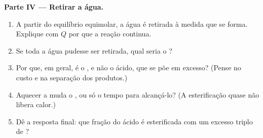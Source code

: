 \begin{problem}
\medskip
\noindent\textbf{Parte IV --- Retirar a água.}
\begin{enumerate}[resume]
  \item A partir do equilíbrio equimolar, a água é retirada à medida que
        se forma. Explique com $Q$ por que a reação continua.
  \item Se toda a água pudesse ser retirada, qual seria o ?
  \item Por que, em geral, é o , e não o ácido, que se põe em
        excesso? (Pense no custo e na separação dos produtos.)
  \item Aquecer a  muda o , ou só o tempo para
        alcançá-lo? (A esterificação quase não libera calor.)
  \item Dê a resposta final: que fração do ácido é esterificada com um
        excesso triplo de ?
\end{enumerate}
\end{problem}

